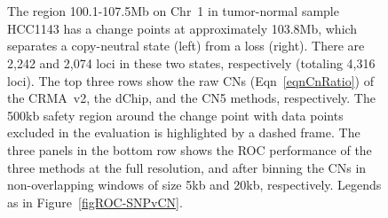 \documentclass{bioinfo}
\begin{document}
\begin{figure}[!tpbh]
\begin{center}
  \\
  \\
\end{center}
 \caption{
  The region 100.1-107.5Mb on Chr~1 in tumor-normal sample HCC1143 has a change points at approximately 103.8Mb, which separates a copy-neutral state (left) from a loss (right).
  There are 2,242 and 2,074 loci in these two states, respectively (totaling 4,316 loci).
  The top three rows show the raw CNs (Eqn~\eqref{eqnCnRatio}) of the CRMA~v2, the dChip, and the CN5 methods, respectively.  The 500kb safety region around the change point with data points excluded in the evaluation is highlighted by a dashed frame.  The three panels in the bottom row shows the ROC performance of the three methods at the full resolution, and after binning the CNs in non-overlapping windows of size 5kb and 20kb, respectively.
  Legends as in Figure~\ref{figROC-SNPvCN}.
 }
 \label{figROC-GSM337641,Chr01}
\end{figure} 
\end{document}
